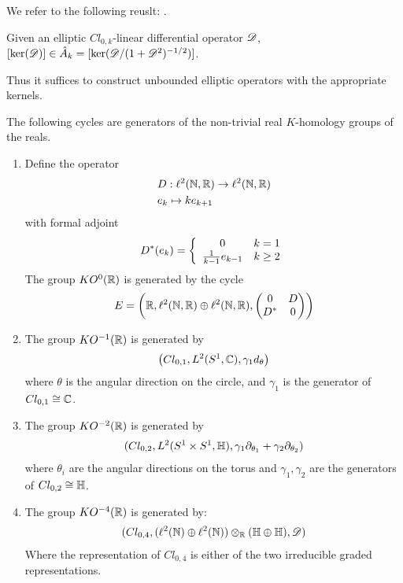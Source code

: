We refer to the following reuslt: \cite[Page 217]{spingeom}.
\begin{proposition}\label{unboundkernel}
	Given an elliptic $Cl_{0,k}$-linear differential operator $\mathscr{D}$, $[\ker(\mathscr{D})]\in \hat{A}_k=[\ker(\mathscr{D}/(1+\mathscr{D}^2)^{-1/2})]$.
\end{proposition}
Thus it suffices to construct unbounded elliptic operators with the appropriate kernels. 
\begin{theorem}
	The following cycles are generators of the non-trivial real $K$-homology groups of the reals. 
	\begin{enumerate}
	\item
	Define the operator 
	\begin{align*}
		&D:\ell^2(\mathbb{N},\mathbb{R})\to \ell^2(\mathbb{N},\mathbb{R}) \\
		&e_k\mapsto ke_{k+1}
	\end{align*}
	with formal adjoint 
	\begin{align*}
		D^*(e_k)=\left \{\begin{array}{c c} 0 & k=1 \\ \frac{1}{k-1}e_{k-1} &  k\geq 2 \end{array} \right .
	\end{align*}
	The group $KO^0(\mathbb{R})$ is generated by the cycle 
	\begin{align*}
		E=\left ( \mathbb{R}, \ell^2(\mathbb{N},\mathbb{R})\oplus \ell^2(\mathbb{N},\mathbb{R}), \begin{pmatrix} 0 & D \\ D^* & 0\end{pmatrix} \right )
	\end{align*}
	\item
		The group $KO^{-1}(\mathbb{R})$ is generated by 
		\begin{align*}
			\left ( Cl_{0,1}, L^2(S^1,\mathbb{C}), \gamma_1 d_\theta \right )
		\end{align*}
		where $\theta$ is the angular direction on the circle, and $\gamma_1$ is the generator of $Cl_{0,1}\cong \mathbb{C}$. 
	\item
		The group $KO^{-2}(\mathbb{R})$ is generated by 
		\begin{align*}
			(Cl_{0,2},L^2(S^1\times S^1,\mathbb{H}),\gamma_1 \partial_{\theta_1}+\gamma_2 \partial_{\theta_2})
		\end{align*}
		where $\theta_i$ are the angular directions on the torus and $\gamma_1,\gamma_2$ are the generators of $Cl_{0,2}\cong \mathbb{H}$.
	\item
		The group $KO^{-4}(\mathbb{R})$ is generated by:
			\begin{align*}
		(Cl_{0,4},(\ell^2(\mathbb{N})\oplus \ell^2(\mathbb{N}))\otimes_{\mathbb{R}} (\mathbb{H}\oplus \mathbb{H}),\mathscr{D})
	\end{align*}
		Where the representation of $Cl_{0,4}$ is either of the two irreducible graded representations. 

	\end{enumerate}
\end{theorem}
